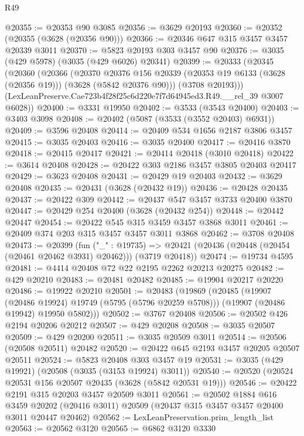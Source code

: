 \begin{lexlean}{R49}
\begin{coremodule}
@20355 := @20353 @90 @3085
@20356 := @3629 @20193
@20360 := @20352 (@20355 (@3628 (@20356 @90)))
@20366 := @20346 @647 @315 @3457 @3457 @20339 @3011
@20370 := @5823 @20193 @303 @3457 @90
@20376 := @3035 (@429 @5978) (@3035 (@429 @6026) @20341)
@20399 := @20333
    (@20345
      (@20360
        (@20366
          (@20370
            @20376
            @156
            @20339
            (@20353 @19 @6133 (@3628 (@20356 @19)))
            (@3628 (@5842 @20376 @90)))
          (@3708 @20193)))
      (LexLeanPreserve.Cae723b4f28f25c6d220e7f7d64945ed3.R49.__rel_39 @3007 @6028))
@20400 := @3331 @19950
@20402 := @3533 (@3543 @20400)
@20403 := @3403 @3098
@20408 := @20402 (@5087 (@3533 (@3552 @20403) @6931))
@20409 := @3596 @20408
@20414 := @20409 @534 @1656 @2187 @3806 @3457
@20415 := @3035 @20403
@20416 := @3035 @20400
@20417 := @20416 @3870
@20418 := @20415 @20417
@20421 := @20414 @20418 (@3010 @20418)
@20422 := @3614 @20408
@20428 := @20422 @303 @2186 @3457 @3805 @20403 @20417
@20429 := @3623 @20408
@20431 := @20429 @19 @20403
@20432 := @3629 @20408
@20435 := @20431 (@3628 (@20432 @19))
@20436 := @20428 @20435
@20437 := @20422 @309
@20442 := @20437 @547 @3457 @3733 @20400 @3870
@20447 := @20429 @254 @20400 (@3628 (@20432 @254))
@20448 := @20442 @20447
@20454 := @20422 @545 @315 @3459 @3457 @3868 @3011
@20461 := @20409 @374 @203 @315 @3457 @3457 @3011 @3868
@20462 := @3708 @20408
@20473 := @20399
    (fun ("_" : @19735) =>
    @20421 (@20436 (@20448 (@20454 (@20461 @20462 @3931) @20462))) (@3719 @20418))
@20474 := @19734 @4595
@20481 := @4414 @20408 @72 @22 @2195 @2262 @20213 @20275
@20482 := @429 @20210
@20483 := @20481 @20482
@20485 := @19904 @20217 @20220
@20486 := @19922 @20210
@20501 := @20483
    (@19869
      (@20485
        (@19907 (@20486 @19924) @19749 (@5795 (@5796 @20259 @5708)))
        (@19907 (@20486 @19942) @19950 @5802)))
@20502 := @3767 @20408
@20506 := @20502 @426 @2194 @20206 @20212
@20507 := @429 @20208
@20508 := @3035 @20507
@20509 := @429 @20200
@20511 := @3035 @20509 @3011
@20514 := @20506 (@20508 @20511) @20482
@20520 := @20422 @645 @2193 @3457 @20205 @20507 @20511
@20524 := @5823 @20408 @303 @3457 @19
@20531 := @3035 (@429 @19921) (@20508 (@3035 (@3153 @19924) @3011))
@20540 := @20520 (@20524 @20531 @156 @20507 @20435 (@3628 (@5842 @20531 @19)))
@20546 := @20422 @2191 @315 @20203 @3457 @20509 @3011
@20561 := @20502
    @1884
    @616
    @3459
    @20202
    (@20416 @3011)
    @20509
    (@20437 @315 @3457 @3457 @20400 @3011 @20447 @20462)
@20562 := LexLeanPreservation.prim_length_list
@20563 := @20562 @3120
@20565 := @6862 @3120 @3330

\end{coremodule}
\end{lexlean}
